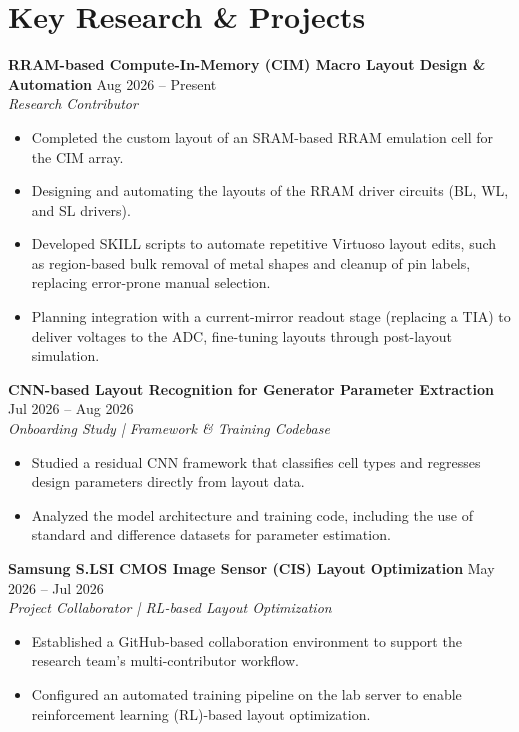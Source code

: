 \documentclass[11pt,a4paper,sans]{article}
\begin{document}
\section{Key Research \& Projects}

\noindent\textbf{RRAM-based Compute-In-Memory (CIM) Macro Layout Design \& Automation} \hfill Aug 2026 -- Present \\
\textit{Research Contributor}
\begin{itemize}[leftmargin=*, noitemsep, topsep=2pt]
    \item Completed the custom layout of an SRAM-based RRAM emulation cell for the CIM array.
    \item Designing and automating the layouts of the RRAM driver circuits (BL, WL, and SL drivers).
    \item Developed SKILL scripts to automate repetitive Virtuoso layout edits, such as region-based bulk removal of metal shapes and cleanup of pin labels, replacing error-prone manual selection.
    \item Planning integration with a current-mirror readout stage (replacing a TIA) to deliver voltages to the ADC, fine-tuning layouts through post-layout simulation.
\end{itemize}

\vspace{5pt}

\noindent\textbf{CNN-based Layout Recognition for Generator Parameter Extraction} \hfill Jul 2026 -- Aug 2026 \\
\textit{Onboarding Study | Framework \& Training Codebase}
\begin{itemize}[leftmargin=*, noitemsep, topsep=2pt]
    \item Studied a residual CNN framework that classifies cell types and regresses design parameters directly from layout data.
    \item Analyzed the model architecture and training code, including the use of standard and difference datasets for parameter estimation.
\end{itemize}

\vspace{5pt}

\noindent\textbf{Samsung S.LSI CMOS Image Sensor (CIS) Layout Optimization} \hfill May 2026 -- Jul 2026 \\
\textit{Project Collaborator | RL-based Layout Optimization}
\begin{itemize}[leftmargin=*, noitemsep, topsep=2pt]
    \item Established a GitHub-based collaboration environment to support the research team's multi-contributor workflow.
    \item Configured an automated training pipeline on the lab server to enable reinforcement learning (RL)-based layout optimization.
\end{itemize}
\end{document}
